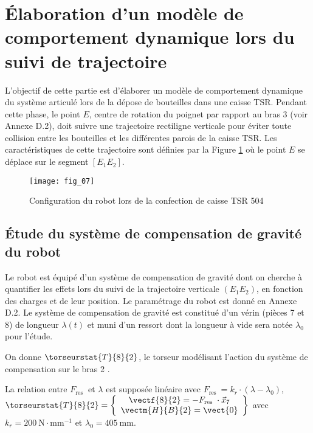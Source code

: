 \section{Élaboration d'un modèle de comportement dynamique lors du suivi de trajectoire}
\ifprof
\else

L'objectif de cette partie est d'élaborer un modèle de comportement dynamique du système articulé lors de la dépose de bouteilles dans une caisse TSR. Pendant cette phase, le point $E$, centre de rotation du poignet par rapport au bras 3 (voir Annexe D.2), doit suivre une trajectoire rectiligne verticale pour éviter toute collision entre les bouteilles et les différentes parois de la caisse TSR. Les caractéristiques de cette trajectoire sont définies par la Figure \ref{fig:07} où le point $E$ se déplace sur le segment $\left[E_{1} E_{2}\right]$.

\begin{figure}[!h]
\centering
\texttt{[image: fig\_07]}
\caption{Configuration du robot lors de la confection de caisse TSR 504 \label{fig:07}}
\end{figure}
\fi

\subsection{Étude du système de compensation de gravité du robot}
\ifprof
\else

Le robot est équipé d'un système de compensation de gravité dont on cherche à quantifier les effets lors du suivi de la trajectoire verticale $\left(E_{1} E_{2}\right)$, en fonction des charges et de leur position. Le paramétrage du robot est donné en Annexe D.2. Le système de compensation de gravité est constitué d'un vérin (pièces 7 et 8) de longueur $\lambda(t)$ et muni d'un ressort dont la longueur à vide sera notée $\lambda_{0}$ pour l'étude.

On donne $\torseurstat{T}{8}{2}$, le torseur modélisant l'action du système de compensation sur le bras 2 .

La relation entre $F_{\text {res }}$ et $\lambda$ est supposée linéaire avec 
$F_{\text {res }}=k_{r} \cdot\left(\lambda-\lambda_{0}\right)$, 
$\torseurstat{T}{8}{2}=
\left\{
\begin{array}{c}
\vectf{8}{2}=-F_{\text {res }} \cdot \vec{x}_{7} \\ 
\vectm{H}{B}{2}=\vect{0} 
\end{array}\right\}$ 
avec
$k_{r}=200 \mathrm{~N} \cdot \mathrm{mm}^{-1}$  et $\lambda_{0}=405 \mathrm{~mm}$.
\fi

